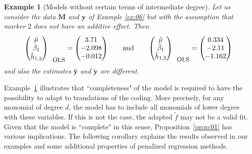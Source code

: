 \documentclass{bmcart}
\newtheorem{example}{Example}
\newcommand{\M}{\mathbf{M}}
\newcommand{\0}{\mathbf{0}}
\newcommand{\y}{\mathbf{y}}
\begin{document}
\begin{example}[Models without certain terms of intermediate degree]\label{ex:07}
	Let us consider the data $\M$ and $\y$ of Example \ref{ex:06} but with the assumption that marker $2$ does not have an additive effect. Then
	$$\begin{pmatrix}
	\hat{\mu} \\
	\hat{\beta}_1 \\
	\hat{h}_{1,2}
	\end{pmatrix}_{\mbox{\small OLS}} = \begin{pmatrix}
	3.71 \\
	-2.098\\
	-0.012\\
	\end{pmatrix}
	\qquad \mbox{and} \qquad \begin{pmatrix}
	\tilde{\mu} \\
	\tilde{\beta}_1 \\
	\tilde{h}_{1,2}
	\end{pmatrix}_{\mbox{\small OLS}}= \begin{pmatrix}
	0.334\\
	-2.11 \\
	-1.162
	\end{pmatrix} $$
	and also the estimates $\hat{\y}$ and $\tilde{\y}$ are different. 
\end{example}
Example~\ref{ex:07} illustrates that   ``completeness" of the model is required to have the possibility to adapt to translations of the coding. 
More precisely, for any monomial of degree $d$, the model has to include all monomials of lower degree with these variables. If this is not the case, the adapted $\tilde{f}$ may not be a valid fit. Given that the model is ``complete" in this sense, Proposition~\ref{prop:01} has various implications.
The following corollary explains the results observed in our examples and some additional properties of penalized regression methods.  
\end{document}
